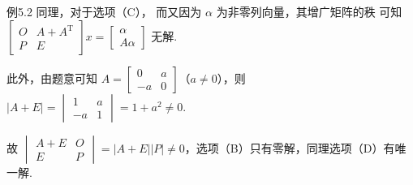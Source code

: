 \begin{fcard}{例5.2}
同理，对于选项（C），
而又因为 $\alpha$ 为非零列向量，其增广矩阵的秩
可知 $\begin{bmatrix}O&A+A^{\mathrm T}\\P&E\end{bmatrix}x=\begin{bmatrix}\alpha\\A\alpha\end{bmatrix}$ 无解.

此外，由题意可知 $A=\begin{bmatrix}0&a\\-a&0\end{bmatrix}$（$a\ne0$），则 $|A+E|=\begin{vmatrix}1&a\\-a&1\end{vmatrix}=1+a^2\ne0$.

故 $\begin{vmatrix}A+E&O\\E&P\end{vmatrix}=|A+E||P|\ne0$，选项（B）只有零解，同理选项（D）有唯一解.
\end{fcard}

